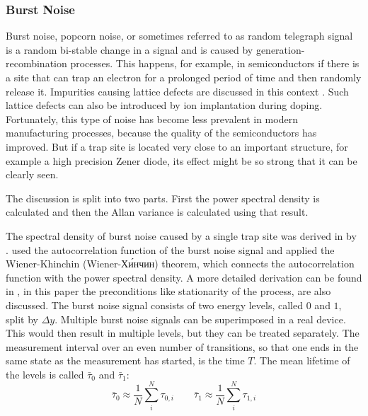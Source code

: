 \subsubsection{Burst Noise}%
\label{sec:theory_burst_noise}
Burst noise, popcorn noise, or sometimes referred to as random telegraph signal is a random bi-stable change in a signal and is caused by generation-recombination processes. This happens, for example, in semiconductors if there is a site that can trap an electron for a prolonged period of time and then randomly release it. Impurities causing lattice defects are discussed in this context \cite{kay2012operational,burst_noise_psd,popcorn_noise_orgin,technote_ti_popcorn_noise}. Such lattice defects can also be introduced by ion implantation during doping. Fortunately, this type of noise has become less prevalent in modern manufacturing processes, because the quality of the semiconductors has improved. But if a trap site is located very close to an important structure, for example a high precision Zener diode, its effect might be so strong that it can be clearly seen.

The discussion is split into two parts. First the power spectral density is calculated and then the Allan variance is calculated using that result.

The spectral density of burst noise caused by a single trap site was derived in \cite{burst_noise_wiener_khinchin} by \citeauthor{burst_noise_wiener_khinchin}. \citeauthor{burst_noise_wiener_khinchin} used the autocorrelation function of the burst noise signal and applied the Wiener-Khinchin (Wiener-Хи́нчин) theorem, which connects the autocorrelation function with the power spectral density. A more detailed derivation can be found in \cite{fundamentals_of_noise_processes}, in this paper the preconditions like stationarity of the process, are also discussed. The burst noise signal consists of two energy levels, called $0$ and $1$, split by $\Delta y$. Multiple burst noise signals can be superimposed in a real device. This would then result in multiple levels, but they can be treated separately. The measurement interval over an even number of transitions, so that one ends in the same state as the measurement has started, is the time $T$. The mean lifetime of the levels is called $\bar \tau_0$ and $\bar \tau_1$:
\begin{equation}
    \bar \tau_{0} \approx \frac 1 N \sum_{i}^N \tau_{0,i} \qquad \bar \tau_{1} \approx \frac 1 N \sum_{i}^N \tau_{1,i}
\end{equation}

